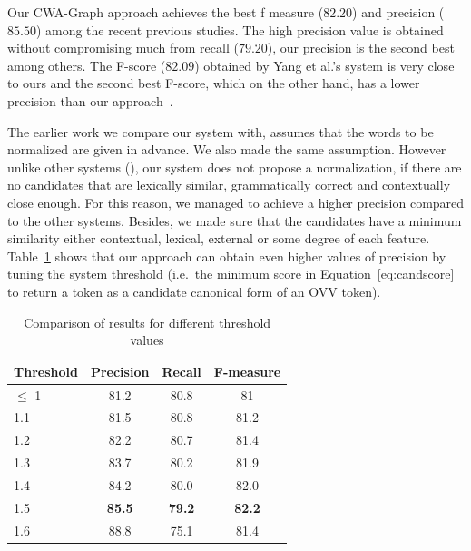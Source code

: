 \documentclass[a4paper,onesided,12pt]{report}
\begin{document}
Our CWA-Graph approach achieves the best f measure ($82.20$) and precision ($85.50$) among the recent previous studies. The high precision value is obtained without compromising much from recall ($79.20$), our precision is the second best among others. The F-score ($82.09$) obtained by Yang et al.'s system is very close to ours and the second best F-score, which on the other hand, has a lower precision than our approach~\cite{DBLP:conf/emnlp/YangE13}.

The earlier work we compare our system with, assumes that the words to be normalized are given in advance. We also made the same assumption. However unlike other systems (\cite{DBLP:conf/emnlp/YangE13,liu2012broad,Han:2011:LNS:2002472.2002520}), our system does not propose a normalization, if there are no candidates that are lexically similar, grammatically correct and contextually close enough. For this reason, we managed to achieve a higher precision compared to the other systems. Besides, we made sure that the candidates have a minimum similarity either contextual, lexical, external or some degree of each feature. Table~\ref{tab:thresholds} shows that our approach can obtain even higher values of precision by tuning the system threshold (i.e.~the minimum score in Equation~\ref{eq:candscore} to return a token as a candidate canonical form of an OVV token).

\begin{table}[thb]
  \caption{Comparison of results for different threshold values}
  \centering
  \begin{tabular}[th]{lccc}
    \hline
    Threshold & Precision & Recall & F-measure \\
    \hline
    $\leq$ 1 & 81.2 &	80.8 &	81 \\
    1.1 & 81.5 & 80.8 &	81.2 \\
    1.2 & 82.2 &	80.7 &	81.4 \\
    1.3 & 83.7 &	80.2 &	81.9 \\
    1.4 & 84.2 &	80.0 &	82.0 \\
    1.5 & \textbf{85.5} &  \textbf{79.2} &  \textbf{82.2} \\
    1.6 & 88.8	& 75.1	& 81.4 \\
    \hline
  \end{tabular}
\label{tab:thresholds}
\end{table}
\end{document}
